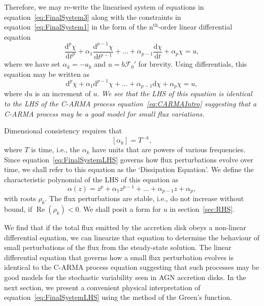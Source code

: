 \documentclass[a4paper,fleqn,usenatbib]{mnras}
\begin{document}
Therefore, we may re-write the linearised system of equations in equation~\eqref{eq:FinalSystem3} along with the constraints in equation~\eqref{eq:FinalSystem1} in the form of the n$^{\mathrm{th}}$-order linear differential equation
\begin{equation}\label{eq:FinalSystemLHS}
\frac{\mathrm{d}^{p}\chi}{\mathrm{d}t^{p}} + \alpha_{1} \frac{\mathrm{d}^{p-1}\chi}{\mathrm{d}t^{p-1}} + \ldots + \alpha_{p-1} \frac{\mathrm{d}\chi}{\mathrm{d}t} + \alpha_{p} \chi = u,
\end{equation}
where we have set $\alpha_{k} = -a_{k}$ and $u = b\mathcal{F}_{0}'$ for brevity. Using differentials, this equation may be written as
\begin{equation}\label{eq:FinalSystemLHSDiff}
\mathrm{d}^{p}\chi + \alpha_{1} \mathrm{d}^{p-1}\chi + \ldots + \alpha_{p-1} \mathrm{d}\chi + \alpha_{p} \chi = u,
\end{equation}
where $\mathrm{d}u$ is an increment of $u$. \textit{We see that the LHS of this equation is identical to the LHS of the C-ARMA process equation~\eqref{eq:CARMAIntro} suggesting that a C-ARMA process may be a good model for small flux variations.}

Dimensional consistency requires that 
\begin{equation}\label{eq:ARUnits}
[\alpha_{k}] = T^{-k},
\end{equation}
where $T$ is time, i.e., the $\alpha_{k}$ have units that are powers of various frequencies. Since equation~\eqref{eq:FinalSystemLHS} governs how flux perturbations evolve over time, we shall refer to this equation as the `Dissipation Equation'. We define the characteristic polynomial of the LHS of this equation as
\begin{equation}\label{eq:ARCharPoly}
\alpha(z) = z^{p} + \alpha_{1} z^{p-1} + \ldots + \alpha_{p-1}z + \alpha_{p},
\end{equation}
with roots $\rho_{k}$. The flux perturbations are stable, i.e., do not increase without bound, if $\operatorname{Re}(\rho_{k}) < 0$. We shall posit a form for $u$ in section~\ref{sec:RHS}. 

We find that if the total flux emitted by the accretion disk obeys a non-linear differential equation, we can linearize that equation to determine the behaviour of small perturbations of the flux from the steady-state solution. The linear differential equation that governs how a small flux perturbation evolves is identical to the C-ARMA process equation suggesting that such processes may be good models for the stochastic variability seen in AGN accretion disks. In the next section, we present a convenient physical interpretation of equation~\eqref{eq:FinalSystemLHS} using the method of the Green's function.
\end{document}
